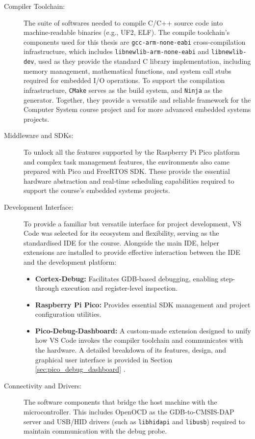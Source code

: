 \begin{description}
    \item[Compiler Toolchain:] The suite of softwares needed to compile C/C++ source code into machine-readable binaries (e.g., UF2, ELF). The compile toolchain's components used for this thesis are \texttt{gcc-arm-none-eabi} cross-compilation infrastructure, which includes \texttt{libnewlib-arm-none-eabi} and \texttt{libnewlib-dev}, used as they provide the standard C library implementation, including memory management, mathematical functions, and system call stubs required for embedded I/O operations. To support the compilation infrastructure, \texttt{CMake} serves as the build system, and \texttt{Ninja} as the generator. Together, they provide a versatile and reliable framework for the Computer System course project and for more advanced embedded systems projects.
    
    \item[Middleware and SDKs:] To unlock all the features supported by the Raspberry Pi Pico platform and complex task management features, the environments also came prepared with Pico and FreeRTOS SDK. These provide the essential hardware abstraction and real-time scheduling capabilities required to support the course's embedded systems projects.
    
    \item[Development Interface:] To provide a familiar but versatile interface for project development, VS Code was selected for its ecosystem and flexibility, serving as the standardised IDE for the course. Alongside the main IDE, helper extensions are installed to provide effective interaction between the IDE and the development platform:
    
    \begin{itemize}
        \item \textbf{Cortex-Debug:}\label{sec:cortex_debug_def} Facilitates GDB-based debugging, enabling step-through execution and register-level inspection.
        \item \textbf{Raspberry Pi Pico:} Provides essential SDK management and project configuration utilities.
        \item \textbf{Pico-Debug-Dashboard:} A custom-made extension designed to unify how VS Code invokes the compiler toolchain and communicates with the hardware. A detailed breakdown of its features, design, and graphical user interface is provided in Section \ref{sec:pico_debug_dashboard} \cite{pico_debug_dashboard}.
    \end{itemize}
    
    \item[Connectivity and Drivers:] The software components that bridge the host machine with the microcontroller. This includes OpenOCD as the GDB-to-CMSIS-DAP server and USB/HID drivers (such as \texttt{libhidapi} and \texttt{libusb}) required to maintain communication with the debug probe.
\end{description}

